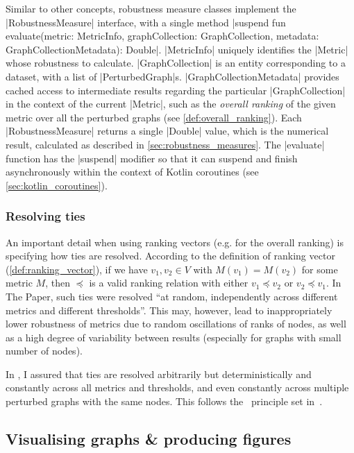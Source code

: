 Similar to other concepts, robustness measure classes implement the |RobustnessMeasure| interface, with a single method |suspend fun evaluate(metric: MetricInfo, graphCollection: GraphCollection, metadata: GraphCollectionMetadata): Double|.
|MetricInfo| uniquely identifies the |Metric| whose robustness to calculate.
|GraphCollection| is an entity corresponding to a dataset, with a list of |PerturbedGraph|s.
|GraphCollectionMetadata| provides cached\footnotemark{} access to intermediate results regarding the particular |GraphCollection| in the context of the current |Metric|, such as the \textsl{overall ranking} of the given metric over all the perturbed graphs (see \autoref{def:overall_ranking}).
Each |RobustnessMeasure| returns a single |Double| value, which is the numerical result, calculated as described in \autoref{sec:robustness_measures}.
The |evaluate| function has the |suspend| modifier so that it can suspend and finish asynchronously within the context of Kotlin coroutines (see \autoref{sec:kotlin_coroutines}).

\subsubsection*{Resolving ties}

An important detail when using ranking vectors (e.g. for the overall ranking) is specifying how ties are resolved.
According to the definition of ranking vector (\cref{def:ranking_vector}), if we have $v_1, v_2 \in V$ with $M(v_1) = M(v_2)$ for some metric $M$, then $\preceq$ is a valid ranking relation with either $v_1 \preceq v_2$ or $v_2 \preceq v_1$.
In The Paper, such ties were resolved \enquote{at random, independently across different metrics and different thresholds}.
This may, however, lead to inappropriately lower robustness of metrics due to random oscillations of ranks of nodes, as well as a high degree of variability between results (especially for graphs with small number of nodes).

In \graffs, I assured that ties are resolved arbitrarily but deterministically and constantly across all metrics and thresholds, and even constantly across multiple perturbed graphs with the same nodes.
This follows the~ principle set in~.

\subsection{Visualising graphs \& producing figures}

